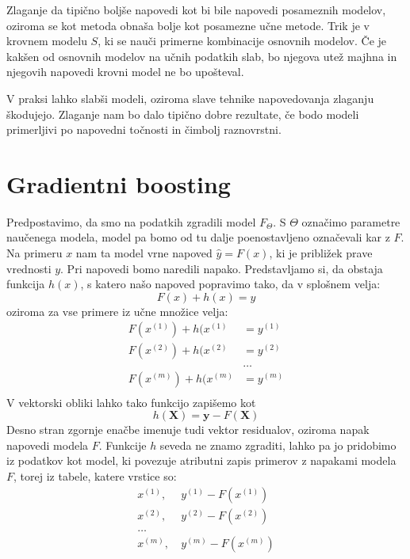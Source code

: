 Zlaganje da tipično boljše napovedi kot bi bile napovedi posameznih modelov, oziroma se kot metoda obnaša bolje kot posamezne učne metode. Trik je v krovnem modelu $S$, ki se nauči primerne kombinacije osnovnih modelov. Če je kakšen od osnovnih modelov na učnih podatkih slab, bo njegova utež majhna in njegovih napovedi krovni model ne bo upošteval.

V praksi lahko slabši modeli, oziroma slave tehnike napovedovanja zlaganju škodujejo. Zlaganje nam bo dalo tipično dobre rezultate, če bodo modeli primerljivi po napovedni točnosti in čimbolj raznovrstni.

\section{Gradientni boosting}

Predpostavimo, da smo na podatkih zgradili model $F_\Theta$. S $\Theta$ označimo parametre naučenega modela, model pa bomo od tu dalje poenostavljeno označevali kar z $F$. Na primeru $x$ nam ta model vrne napoved $\hat{y}=F(x)$, ki je približek prave vrednosti $y$. Pri napovedi bomo naredili napako. Predstavljamo si, da obstaja funkcija $h(x)$, s katero našo napoved popravimo tako, da v splošnem velja:
\begin{equation}
  F(x)+h(x)=y \nonumber
\end{equation}
oziroma za vse primere iz učne množice velja:
\begin{equation}
  \begin{split}
    F(x^{(1)})+h(x^{(1)}& = y^{(1)} \\
    F(x^{(2)})+h(x^{(2)}& = y^{(2)} \\
    & \ldots \\
    F(x^{(m)})+h(x^{(m)}& = y^{(m)} \\
  \end{split}
  \label{eq:gb-residual}
\end{equation}
%
V vektorski obliki lahko tako funkcijo zapišemo kot
\begin{equation}
  h({\bm X})={\bm y}-F({\bm X}) \nonumber
\end{equation}
%
Desno stran zgornje enačbe imenuje tudi vektor residualov, oziroma napak napovedi modela $F$. Funkcije $h$ seveda ne znamo zgraditi, lahko pa jo pridobimo iz podatkov kot model, ki povezuje atributni zapis primerov z napakami modela $F$, torej iz tabele, katere vrstice so:
\begin{equation}
  \nonumber
  \begin{split}
  x^{(1)}, &\ y^{(1)}-F(x^{(1)}) \\
  x^{(2)}, &\ y^{(2)}-F(x^{(2)}) \\
  \ldots \\
  x^{(m)}, &\ y^{(m)}-F(x^{(m)})
  \end{split}
\end{equation}


